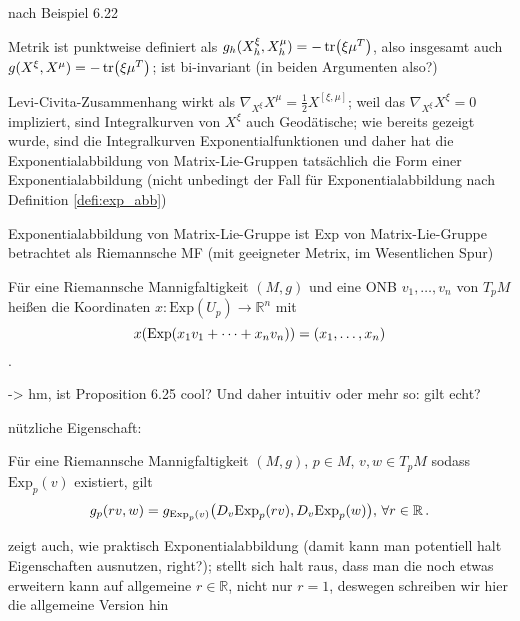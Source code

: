 \documentclass[../H_Analysis_main.tex]{subfiles}
\begin{document}
\begin{bsp}
nach Beispiel 6.22

Metrik ist punktweise definiert als $g_h(X^\xi_h, X^\mu_h) = - \tr(\xi \mu^T)$, also insgesamt auch $g(X^\xi, X^\mu) = - \tr(\xi \mu^T)$; ist bi-invariant (in beiden Argumenten also?)

Levi-Civita-Zusammenhang wirkt als $\nabla_{X^\xi} X^\mu = \frac{1}{2} X^{[\xi, \mu]}$; weil das $\nabla_{X^\xi} X^\xi = 0$ impliziert, sind Integralkurven von $X^\xi$ auch Geodätische; wie bereits gezeigt wurde, sind die Integralkurven Exponentialfunktionen und daher hat die Exponentialabbildung von Matrix-Lie-Gruppen tatsächlich die Form einer Exponentialabbildung (nicht unbedingt der Fall für Exponentialabbildung nach Definition \ref{defi:exp_abb})

Exponentialabbildung von Matrix-Lie-Gruppe ist Exp von Matrix-Lie-Gruppe betrachtet als Riemannsche MF (mit geeigneter Metrix, im Wesentlichen Spur)
\end{bsp}


\begin{defi}
Für eine Riemannsche Mannigfaltigkeit $(M, g)$ und eine ONB $v_1, \dots, v_n$ von $T_p M$ heißen die Koordinaten $x: \text{Exp}(U_p) \rightarrow \mathbb{R}^n$ mit
\begin{equation}
x(\text{Exp}(x_1 v_1 + \dots + x_n v_n)) = \qty(x_1, \dots, x_n)
\end{equation}
.
\end{defi}

-> hm, ist Proposition 6.25 cool? Und daher intuitiv oder mehr so: gilt echt?


nützliche Eigenschaft:
\begin{lemma}
Für eine Riemannsche Mannigfaltigkeit $(M, g)$, $p \in M$, $v, w \in T_p M$ sodass $\text{Exp}_p (v)$ existiert, gilt
\begin{equation}
g_p(r v, w) = g_{\text{Exp}_p(v)} \qty(D_v \text{Exp}_p (r v), D_v \text{Exp}_p (w)), \, \forall r \in \mathbb{R} \, .
\end{equation}
\end{lemma}
zeigt auch, wie praktisch Exponentialabbildung (damit kann man potentiell halt Eigenschaften ausnutzen, right?); stellt sich halt raus, dass man die noch etwas erweitern kann auf allgemeine $r \in \mathbb{R}$, nicht nur $r = 1$, deswegen schreiben wir hier die allgemeine Version hin
\end{document}
